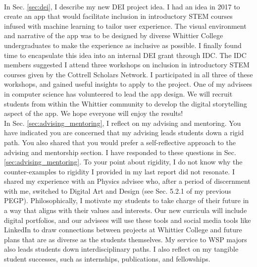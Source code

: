 \documentclass[../../main.tex]{subfiles}
\begin{document}
\\
\vspace{0.25cm}
In Sec. \ref{sec:dei}, I describe my new DEI project idea.  I had an idea in 2017 to create an app that would facilitate inclusion in introductory STEM courses infused with machine learning to tailor user experience.  The visual environment and narrative of the app was to be designed by diverse Whittier College undergraduates to make the experience as inclusive as possible.  I finally found time to encapsulate this idea into an internal DEI grant through IDC.  The IDC members suggested I attend three workshops on inclusion in introductory STEM courses given by the Cottrell Scholars Network.  I participated in all three of these workshops, and gained useful insights to apply to the project.  One of my advisees in computer science has volunteered to lead the app design.  We will recruit students from within the Whittier community to develop the digital storytelling aspect of the app.  We hope everyone will enjoy the results!
\\
\vspace{0.25cm}
In Sec. \ref{sec:advising_mentoring}, I reflect on my advising and mentoring.  You have indicated you are concerned that my advising leads students down a rigid path.  You also shared that you would prefer a self-reflective approach to the advising and mentorship section.  I have responded to these questions in Sec. \ref{sec:advising_mentoring}.  To your point about rigidity, I do not know why the counter-examples to rigidity I provided in my last report did not resonate.  I shared my experience with an Physics advisee who, after a period of discernment with me, switched to Digital Art and Design (see Sec. 5.2.1 of my previous PEGP).  Philosophically, I motivate my students to take charge of their future in a way that aligns with their values and interests.  Our new curricula will include digital portfolios, and our advisees will use these tools and social media tools like LinkedIn to draw connections between projects at Whittier College and future plans that are as diverse as the students themselves.  My service to WSP majors also leads students down interdisciplinary paths.  I also reflect on my tangible student successes, such as internships, publications, and fellowships.
\\
\vspace{0.25cm}
\end{document}
